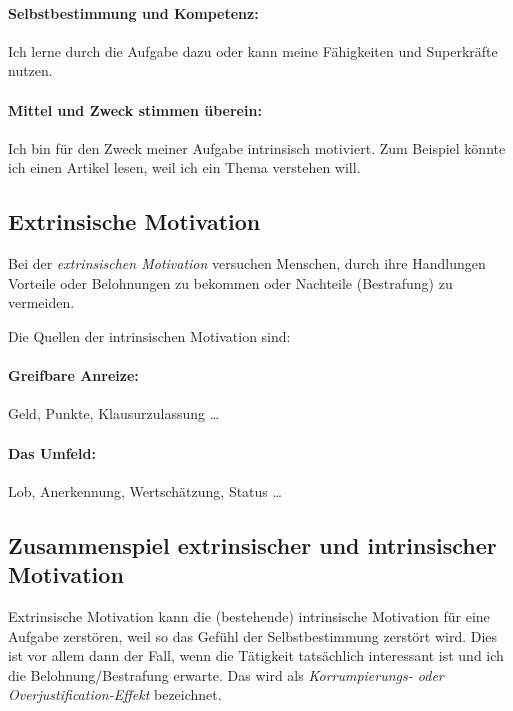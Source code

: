 \paragraph{Selbstbestimmung und Kompetenz:} Ich lerne durch die Aufgabe dazu oder kann meine Fähigkeiten und Superkräfte nutzen.

\paragraph{Mittel und Zweck stimmen überein:} Ich bin für den Zweck meiner Aufgabe intrinsisch motiviert. Zum Beispiel könnte ich einen Artikel lesen, weil ich ein Thema verstehen will.


\subsection{Extrinsische Motivation}
\label{extrinsische-motivation}

Bei der \emph{extrinsischen Motivation} versuchen Menschen, durch ihre Handlungen Vorteile oder Belohnungen zu bekommen oder Nachteile (Bestrafung) zu vermeiden.

Die Quellen der intrinsischen Motivation sind:

\paragraph{Greifbare Anreize:} Geld, Punkte, Klausurzulassung \ldots

\paragraph{Das Umfeld:} Lob, Anerkennung, Wertschätzung, Status \ldots
{}

\subsection{Zusammenspiel extrinsischer und intrinsischer Motivation}

Extrinsische Motivation kann die (bestehende) intrinsische Motivation für eine Aufgabe zerstören, weil so das Gefühl der Selbstbestimmung zerstört wird. Dies ist vor allem dann der Fall, wenn die Tätigkeit tatsächlich interessant ist und ich die Belohnung/Bestrafung erwarte. Das wird als \emph{Korrumpierungs- oder Overjustification-Effekt} bezeichnet.~\cite{extrinsic-effects}
